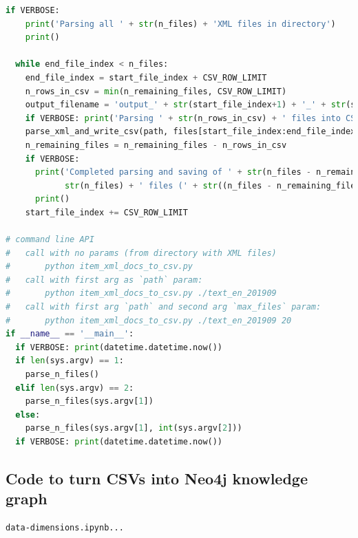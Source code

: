 \documentclass[11pt]{article}
\begin{document}
\begin{lstlisting}[language=Python, basicstyle=\tiny]
  if VERBOSE:
    print('Parsing all ' + str(n_files) + 'XML files in directory')
    print()

  while end_file_index < n_files:
    end_file_index = start_file_index + CSV_ROW_LIMIT
    n_rows_in_csv = min(n_remaining_files, CSV_ROW_LIMIT)
    output_filename = 'output_' + str(start_file_index+1) + '_' + str(start_file_index + n_rows_in_csv) + '.csv'
    if VERBOSE: print('Parsing ' + str(n_rows_in_csv) + ' files into CSV rows in: ' + output_filename)
    parse_xml_and_write_csv(path, files[start_file_index:end_file_index], output_filename)
    n_remaining_files = n_remaining_files - n_rows_in_csv
    if VERBOSE:
      print('Completed parsing and saving of ' + str(n_files - n_remaining_files) + '/' + \
            str(n_files) + ' files (' + str((n_files - n_remaining_files) / n_files * 100) + '%)')
      print()
    start_file_index += CSV_ROW_LIMIT

# command line API
#   call with no params (from directory with XML files)
#       python item_xml_docs_to_csv.py
#   call with first arg as `path` param:
#       python item_xml_docs_to_csv.py ./text_en_201909
#   call with first arg `path` and second arg `max_files` param:
#       python item_xml_docs_to_csv.py ./text_en_201909 20
if __name__ == '__main__':
  if VERBOSE: print(datetime.datetime.now())
  if len(sys.argv) == 1:
    parse_n_files()
  elif len(sys.argv) == 2:
    parse_n_files(sys.argv[1])
  else:
    parse_n_files(sys.argv[1], int(sys.argv[2]))
  if VERBOSE: print(datetime.datetime.now())

\end{lstlisting}
\newpage

\subsection{Code to turn CSVs into Neo4j knowledge graph}
\label{sec:AppendixB}

\begin{lstlisting}
data-dimensions.ipynb...

\end{lstlisting}
\newpage
\end{document}
